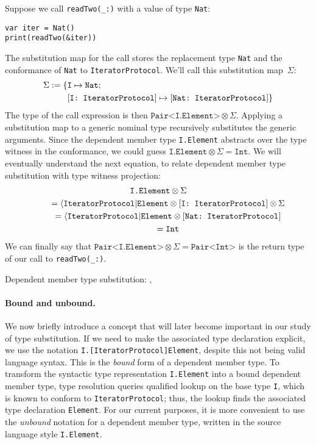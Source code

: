 \documentclass[../generics]{subfiles}
\begin{document}
Suppose we call \verb|readTwo(_:)| with a value of type \texttt{Nat}:
\begin{Verbatim}
var iter = Nat()
print(readTwo(&iter))
\end{Verbatim}
The substitution map for the call stores the replacement type \texttt{Nat} and the conformance of \texttt{Nat} to \texttt{IteratorProtocol}. We'll call this substitution map~$\Sigma$:
\begin{align*}
\Sigma := \{&\texttt{I} \mapsto \texttt{Nat};\,\\
&[\texttt{I:~IteratorProtocol}] \mapsto [\texttt{Nat:~IteratorProtocol}]\}
\end{align*}
The type of the call expression is then $\texttt{Pair<I.Element>}\otimes\Sigma$. Applying a substitution map to a generic nominal type recursively substitutes the generic arguments. Since the dependent member type \texttt{I.Element} abstracts over the type witness in the conformance, we could guess $\texttt{I.Element}\otimes\Sigma=\texttt{Int}$. We will eventually understand the next equation, to relate dependent member type substitution with type witness projection:
\begin{gather*}
\texttt{I.Element}\otimes\Sigma\\
\qquad {} = \langle\texttt{IteratorProtocol}|\texttt{Element}\otimes [\texttt{I:~IteratorProtocol}]\otimes\Sigma\\
\qquad {} = \langle\texttt{IteratorProtocol}|\texttt{Element}\otimes [\texttt{Nat:~IteratorProtocol}]\\
\qquad {} = \texttt{Int}
\end{gather*}
We can finally say that $\texttt{Pair<I.Element>}\otimes\Sigma=\texttt{Pair<Int>}$ is the return type of our call to \verb|readTwo(_:)|.

\begin{MoreDetails}
\item Dependent member type substitution: , 
\end{MoreDetails}

\paragraph{Bound and unbound.}
We now briefly introduce a concept that will later become important in our study of type substitution. If we need to make the associated type declaration explicit, we use the notation \verb|I.[IteratorProtocol]Element|, despite this not being valid language syntax. This is the \emph{bound} form of a dependent member type. To transform the syntactic type representation \texttt{I.Element} into a bound dependent member type, type resolution queries qualified lookup on the base type \texttt{I}, which is known to conform to \texttt{IteratorProtocol}; thus, the lookup finds the associated type declaration \texttt{Element}. For our current purposes, it is more convenient to use the \emph{unbound} notation for a dependent member type, written in the source language style \texttt{I.Element}.
\end{document}
